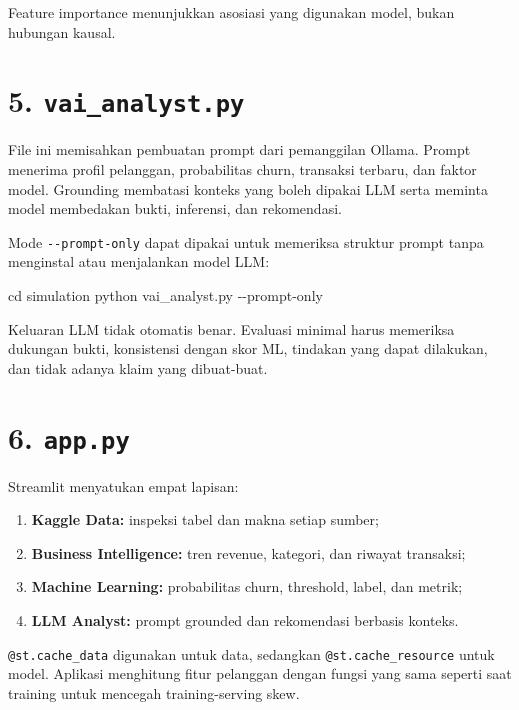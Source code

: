 \documentclass[
  indonesian,
  letterpaper,
  DIV=11,
  numbers=noendperiod]{scrreprt}
\newenvironment{Shaded}{\begin{snugshade}}{\end{snugshade}}
\newcommand{\AttributeTok}[1]{\textcolor[rgb]{0.40,0.45,0.13}{#1}}
\newcommand{\BuiltInTok}[1]{\textcolor[rgb]{0.00,0.23,0.31}{#1}}
\newcommand{\ExtensionTok}[1]{\textcolor[rgb]{0.00,0.23,0.31}{#1}}
\newcommand{\NormalTok}[1]{\textcolor[rgb]{0.00,0.23,0.31}{#1}}
\providecommand{\tightlist}{%
  \setlength{\itemsep}{0pt}\setlength{\parskip}{0pt}}
\begin{document}
Feature importance menunjukkan asosiasi yang digunakan model, bukan
hubungan kausal.

\section{\texorpdfstring{5.
\texttt{vai\_analyst.py}}{5. vai\_analyst.py}}\label{vai_analyst.py}

File ini memisahkan pembuatan prompt dari pemanggilan Ollama. Prompt
menerima profil pelanggan, probabilitas churn, transaksi terbaru, dan
faktor model. Grounding membatasi konteks yang boleh dipakai LLM serta
meminta model membedakan bukti, inferensi, dan rekomendasi.

Mode \texttt{-\/-prompt-only} dapat dipakai untuk memeriksa struktur
prompt tanpa menginstal atau menjalankan model LLM:

\begin{Shaded}
\begin{Highlighting}[]
\BuiltInTok{cd}\NormalTok{ simulation}
\ExtensionTok{python}\NormalTok{ vai\_analyst.py }\AttributeTok{{-}{-}prompt{-}only}
\end{Highlighting}
\end{Shaded}

Keluaran LLM tidak otomatis benar. Evaluasi minimal harus memeriksa
dukungan bukti, konsistensi dengan skor ML, tindakan yang dapat
dilakukan, dan tidak adanya klaim yang dibuat-buat.

\section{\texorpdfstring{6. \texttt{app.py}}{6. app.py}}\label{app.py}

Streamlit menyatukan empat lapisan:

\begin{enumerate}
\def\labelenumi{\arabic{enumi}.}
\tightlist
\item
  \textbf{Kaggle Data:} inspeksi tabel dan makna setiap sumber;
\item
  \textbf{Business Intelligence:} tren revenue, kategori, dan riwayat
  transaksi;
\item
  \textbf{Machine Learning:} probabilitas churn, threshold, label, dan
  metrik;
\item
  \textbf{LLM Analyst:} prompt grounded dan rekomendasi berbasis
  konteks.
\end{enumerate}

\texttt{@st.cache\_data} digunakan untuk data, sedangkan
\texttt{@st.cache\_resource} untuk model. Aplikasi menghitung fitur
pelanggan dengan fungsi yang sama seperti saat training untuk mencegah
training-serving skew.
\end{document}
